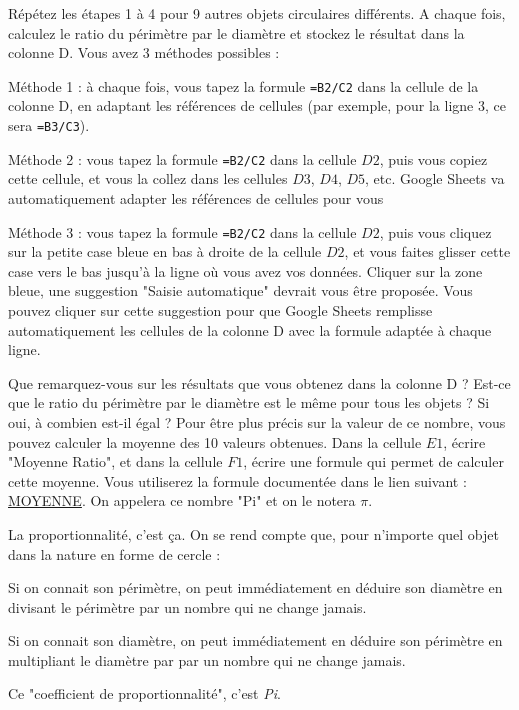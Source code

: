 \documentclass{exam}
\begin{document}
\begin{questions}
\question Répétez les étapes 1 à 4 pour 9 autres objets circulaires différents. A chaque fois, calculez le ratio du périmètre par le diamètre et stockez le résultat dans la colonne D. Vous avez 3 méthodes possibles : 
\begin{compactitem}
  \item Méthode 1 : à chaque fois, vous tapez la formule \verb|=B2/C2| dans la cellule de la colonne D, en adaptant les références de cellules (par exemple, pour la ligne 3, ce sera \verb|=B3/C3|).
  \item Méthode 2 : vous tapez la formule \verb|=B2/C2| dans la cellule $D2$, puis vous copiez cette cellule, et vous la collez dans les cellules $D3$, $D4$, $D5$, etc. Google Sheets va automatiquement adapter les références de cellules pour vous
  \item Méthode 3 : vous tapez la formule \verb|=B2/C2| dans la cellule $D2$, puis vous cliquez sur la petite case bleue en bas à droite de la cellule $D2$, et vous faites glisser cette case vers le bas jusqu'à la ligne où vous avez vos données. Cliquer sur la zone bleue, une suggestion "Saisie automatique" devrait vous être proposée. Vous pouvez cliquer sur cette suggestion pour que Google Sheets remplisse automatiquement les cellules de la colonne D avec la formule adaptée à chaque ligne.
\end{compactitem}
\question Que remarquez-vous sur les résultats que vous obtenez dans la colonne D ? Est-ce que le ratio du périmètre par le diamètre est le même pour tous les objets ? Si oui, à combien est-il égal ? Pour être plus précis sur la valeur de ce nombre, vous pouvez calculer la moyenne des 10 valeurs obtenues. Dans la cellule $E1$, écrire "Moyenne Ratio", et dans la cellule $F1$, écrire une formule qui permet de calculer cette moyenne. Vous utiliserez la formule documentée dans le lien suivant : \href{https://support.google.com/docs/answer/3093615?hl=fr}{MOYENNE}. On appelera ce nombre "Pi" et on le notera $\pi$.

\begin{Indication}
  La proportionnalité, c'est ça. On se rend compte que, pour n'importe quel objet dans la nature en forme de cercle : 
  \begin{compactitem}
  \item Si on connait son périmètre, on peut immédiatement en déduire son diamètre en divisant le périmètre par un nombre qui ne change jamais.
  \item Si on connait son diamètre, on peut immédiatement en déduire son périmètre en multipliant le diamètre par par un nombre qui ne change jamais.
  \end{compactitem}
  Ce "coefficient de proportionnalité", c'est \textit{Pi}. 
\end{Indication}


\end{questions}
\end{document}
